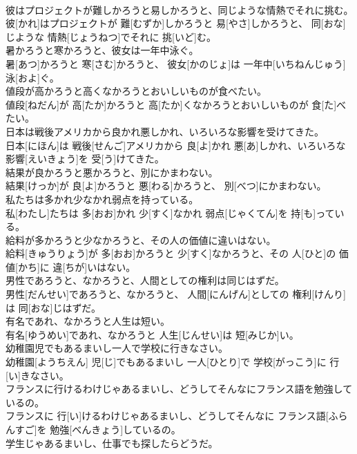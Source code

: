 \documentclass[8pt]{extreport}
\begin{document}
\begin{CJK}{UTF8}{min}
\\	彼はプロジェクトが難しかろうと易しかろうと、同じような情熱でそれに挑む。	
\\	彼[かれ]はプロジェクトが 難[むずか]しかろうと 易[やさ]しかろうと、 同[おな]じような 情熱[じょうねつ]でそれに 挑[いど]む。
\\	暑かろうと寒かろうと、彼女は一年中泳ぐ。	
\\	暑[あつ]かろうと 寒[さむ]かろうと、 彼女[かのじょ]は 一年中[いちねんじゅう] 泳[およ]ぐ。
\\	値段が高かろうと高くなかろうとおいしいものが食べたい。	
\\	値段[ねだん]が 高[たか]かろうと 高[たか]くなかろうとおいしいものが 食[た]べたい。
\\	日本は戦後アメリカから良かれ悪しかれ、いろいろな影響を受けてきた。	
\\	日本[にほん]は 戦後[せんご]アメリカから 良[よ]かれ 悪[あ]しかれ、いろいろな 影響[えいきょう]を 受[う]けてきた。
\\	結果が良かろうと悪かろうと、別にかまわない。	
\\	結果[けっか]が 良[よ]かろうと 悪[わる]かろうと、 別[べつ]にかまわない。
\\	私たちは多かれ少なかれ弱点を持っている。	
\\	私[わたし]たちは 多[おお]かれ 少[すく]なかれ 弱点[じゃくてん]を 持[も]っている。
\\	給料が多かろうと少なかろうと、その人の価値に違いはない。	
\\	給料[きゅうりょう]が 多[おお]かろうと 少[すく]なかろうと、その 人[ひと]の 価値[かち]に 違[ちが]いはない。
\\	男性であろうと、なかろうと、人間としての権利は同じはずだ。	
\\	男性[だんせい]であろうと、なかろうと、 人間[にんげん]としての 権利[けんり]は 同[おな]じはずだ。
\\	有名であれ、なかろうと人生は短い。	
\\	有名[ゆうめい]であれ、なかろうと 人生[じんせい]は 短[みじか]い。
\\	幼稚園児でもあるまいし一人で学校に行きなさい。	
\\	幼稚園[ようちえん] 児[じ]でもあるまいし 一人[ひとり]で 学校[がっこう]に 行[い]きなさい。
\\	フランスに行けるわけじゃあるまいし、どうしてそんなにフランス語を勉強しているの。	
\\	フランスに 行[い]けるわけじゃあるまいし、どうしてそんなに フランス語[ふらんすご]を 勉強[べんきょう]しているの。
\\	学生じゃあるまいし、仕事でも探したらどうだ。	

\end{CJK}
\end{document}
